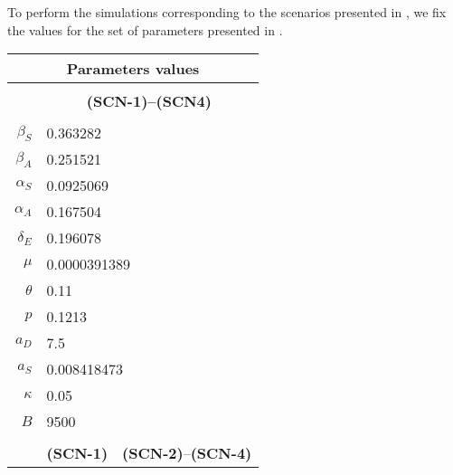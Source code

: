 %
To perform the simulations corresponding to the scenarios presented in
, we fix the values for the set of parameters
presented in .
%
\begin{table}[tbh]
    \begin{center}
        \begin{tabular}{rc@{}c}
            \toprule
            \multicolumn{3}{c}{\textbf{Parameters values}}
            \\
            \midrule
            \\
                & \multicolumn{2}{c}{\textbf{(SCN-1)--(SCN4)}}
                \\
                \cmidrule{2-3}
                \\
                $\beta_S$
                & \multicolumn{2}{l}{\num{0.363282}}
            \\
                $\beta_A$
                & \multicolumn{2}{l}{\num{0.251521}}
            \\
                $\alpha_{S}$
                & \multicolumn{2}{l}{\num{0.0925069}}
            \\
                $\alpha_{A}$
                & \multicolumn{2}{l}{\num{0.167504}}
            \\
                $\delta_{E}$
                & \multicolumn{2}{l}{\num{0.196078}}
            \\
                $\mu$
                &\multicolumn{2}{l}{\num{0.0000391389}}
            \\
                $\theta$
                & \multicolumn{2}{l}{\num{0.11}}
            \\
                $p$
                & \multicolumn{2}{l}{\num{0.1213}}
            \\
                $a_D$
                & \multicolumn{2}{l}{\num{7.5}}
            \\
                $a_S$
                & \multicolumn{2}{l}{\num{0.008418473}}
            \\
                $\kappa$
                & \multicolumn{2}{l}{\num{0.05}}
            \\
                $B$
                & \multicolumn{2}{l}{\num{9500}}
            \\
            \\
                & \textbf{(SCN-1)}
                & \textbf{(SCN-2)}--\textbf{(SCN-4)}
            \\
                \cmidrule{2-3}

\end{tabular}
\end{center}
\end{table}
